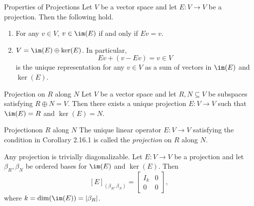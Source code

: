 \documentclass[linearalgebraII]{subfiles}
\begin{document}
    \begin{prop}{Properties of Projections}
        Let $V$ be a vector space and let $E: V\to V$ be a projection. Then the following hold.
        \begin{enumerate}
            \item For any $v\in V$, $v\in \im(E)$ if and only if $Ev = v$.
            \item $V = \im(E)\oplus \ker(E)$. In particular,
                \begin{equation*}
                    Ev + (v-Ev) = v\in V
                \end{equation*}
                is the unique representation for any $v\in V$ as a sum of vectors in $\im(E)$ and $\ker(E)$.
        \end{enumerate}
    \end{prop}

    \begin{cor}{Projection on $R$ along $N$}
        Let $V$ be a vector space and let $R, N\subseteq V$ be subspaces satisfying $R\oplus N = V$. Then there exists a unique projection $E:V\to V$ such that $\im(E) = R$ and $\ker(E) = N$.
    \end{cor}	

    \begin{definition}{Projection}{on $R$ along $N$}
        The unique linear operator $E:V\to V$ satisfying the condition in Corollary 2.16.1 is called the \emph{projection} on $R$ along $N$.
    \end{definition}

    \begin{remark}
        Any projection is trivially diagonalizable. Let $E: V\to V$ be a projection and let $\beta_R,\beta_N$ be ordered bases for $\im(E)$ and $\ker(E)$. Then
        \begin{equation*}
            \left[ E \right]_{\left( \beta_R, \beta_N \right)} = \begin{bmatrix} I_k & 0 \\ 0 & 0 \end{bmatrix},
        \end{equation*}
        where $k = \dim(\im(E)) = \left| \beta_R \right|$.
    \end{remark}
\end{document}
